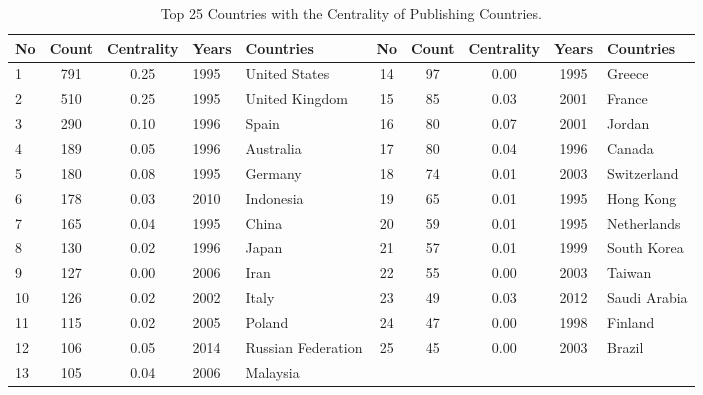 \documentclass[english]{textolivre}
\begin{document}
\begin{table}[h!]
\centering
\small
\begin{threeparttable}
\caption{Top 25 Countries with the Centrality of Publishing Countries.}\label{tab-1}
\begin{tabular}{p{0.1cm}ccp{0.8cm}lccccl}
\toprule
No & Count & Centrality & Years & Countries & No & Count & Centrality & Years & Countries \\
\midrule
1  & 791 & 0.25 & 1995 & United States      & 14 & 97 & 0.00 & 1995 & Greece              \\
2  & 510 & 0.25 & 1995 & United Kingdom     & 15 & 85 & 0.03 & 2001 & France              \\
3  & 290 & 0.10 & 1996 & Spain              & 16 & 80 & 0.07 & 2001 & Jordan              \\
4  & 189 & 0.05 & 1996 & Australia          & 17 & 80 & 0.04 & 1996 & Canada              \\
5  & 180 & 0.08 & 1995 & Germany            & 18 & 74 & 0.01 & 2003 & Switzerland         \\
6  & 178 & 0.03 & 2010 & Indonesia          & 19 & 65 & 0.01 & 1995 & Hong Kong           \\
7  & 165 & 0.04 & 1995 & China              & 20 & 59 & 0.01 & 1995 & Netherlands         \\
8  & 130 & 0.02 & 1996 & Japan              & 21 & 57 & 0.01 & 1999 & South Korea         \\
9  & 127 & 0.00 & 2006 & Iran               & 22 & 55 & 0.00 & 2003 & Taiwan              \\
10 & 126 & 0.02 & 2002 & Italy              & 23 & 49 & 0.03 & 2012 & Saudi Arabia        \\
11 & 115 & 0.02 & 2005 & Poland             & 24 & 47 & 0.00 & 1998 & Finland             \\
12 & 106 & 0.05 & 2014 & Russian Federation & 25 & 45 & 0.00 & 2003 & Brazil              \\
13 & 105 & 0.04 & 2006 & Malaysia           &    &    &      &      &                     \\
\bottomrule
\end{tabular}
\end{threeparttable}
\end{table}
\end{document}
